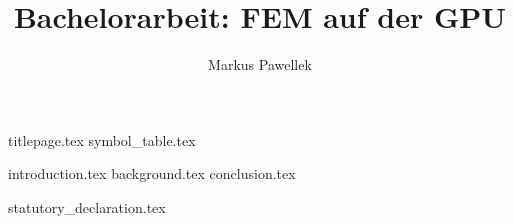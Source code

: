 \documentclass[9pt,fleqn,a4paper]{article}
\title{Bachelorarbeit: FEM auf der GPU}
\author{Markus Pawellek}
\begin{document}
  {titlepage.tex}
  {symbol_table.tex}
  \cleardoublepage
  \tableofcontents

  \cleardoublepage
  {introduction.tex}
  {background.tex}
  {conclusion.tex}

  \cleardoublepage
  {statutory_declaration.tex}
\end{document}
